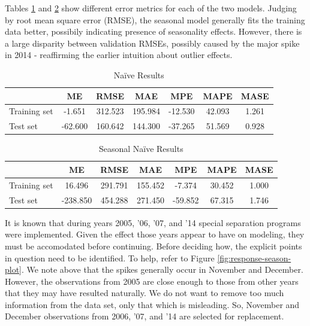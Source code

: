 \documentclass[12pt,letterpaper,toc=flat,oneside]{report}
\theoremstyle{definition}
\theoremstyle{definition}
\theoremstyle{definition}
\theoremstyle{remark}
\begin{document}
Tables \ref{tab:n-err} and \ref{tab:sn-err} show different error metrics
for each of the two models. Judging by root mean square error (RMSE),
the seasonal model generally fits the training data better, possibily
indicating presence of seasonality effects. However, there is a large
disparity between validation RMSEs, possibly caused by the major spike
in 2014 - reaffirming the earlier intuition about outlier effects.

\begin{table}[!h]

\caption{\label{tab:n-err}Na\"ive Results}
\centering
\begin{tabular}[t]{lcccccc}
\toprule
\bfseries{ } & \bfseries{ME} & \bfseries{RMSE} & \bfseries{MAE} & \bfseries{MPE} & \bfseries{MAPE} & \bfseries{MASE}\\
\midrule
Training set & -1.651 & 312.523 & 195.984 & -12.530 & 42.093 & 1.261\\
Test set & -62.600 & 160.642 & 144.300 & -37.265 & 51.569 & 0.928\\
\bottomrule
\end{tabular}
\end{table}\begin{table}[!h]

\caption{\label{tab:sn-err}Seasonal Na\"ive Results}
\centering
\begin{tabular}[t]{lcccccc}
\toprule
\bfseries{ } & \bfseries{ME} & \bfseries{RMSE} & \bfseries{MAE} & \bfseries{MPE} & \bfseries{MAPE} & \bfseries{MASE}\\
\midrule
Training set & 16.496 & 291.791 & 155.452 & -7.374 & 30.452 & 1.000\\
Test set & -238.850 & 454.288 & 271.450 & -59.852 & 67.315 & 1.746\\
\bottomrule
\end{tabular}
\end{table}

It is known that during years 2005, '06, '07, and '14 special separation
programs were implemented. Given the effect those years appear to have
on modeling, they must be accomodated before continuing. Before deciding
how, the explicit points in question need to be identified. To help,
refer to Figure \ref{fig:response-season-plot}. We note above that the
spikes generally occur in November and December. However, the
observations from 2005 are close enough to those from other years that
they may have resulted naturally. We do not want to remove too much
information from the data set, only that which is misleading. So,
November and December observations from 2006, '07, and '14 are selected
for replacement.
\end{document}

